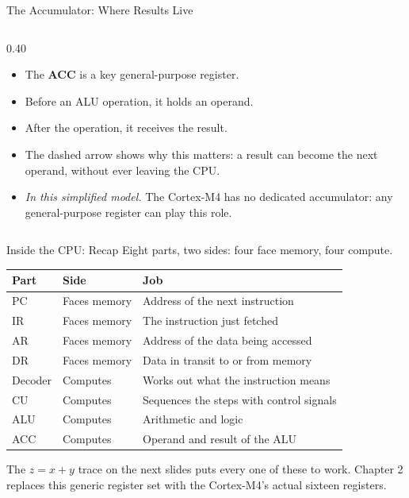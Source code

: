 \documentclass[9pt,aspectratio=169,xcolor=table]{beamer}
\begin{document}
\begin{frame}{The Accumulator: Where Results Live}
\begin{columns}[c, onlytextwidth]
		\begin{column}{0.40\textwidth}
			\small
			\begin{itemize}
				\setlength{\itemsep}{0.6em}
				\item The \textbf{ACC} is a key general-purpose register.
				\item \alert{Before} an ALU operation, it holds an operand.
				\item \alert{After} the operation, it receives the result.
				\item The dashed arrow shows why this matters: a result can become
				the next operand, without ever leaving the CPU.
				\item \emph{In this simplified model.} The Cortex-M4 has no dedicated
				accumulator: any general-purpose register can play this role.
			\end{itemize}
		\end{column}

	\end{columns}
\end{frame}

\begin{frame}{Inside the CPU: Recap}
    \leavevmode
    {\small Eight parts, two sides: four \alert{face memory}, four \alert{compute}.}

    \vspace{2mm}
    \begin{center}
    {\small
    \striped
    \begin{tabular}{@{}l l l@{}}
        \toprule
        \textbf{Part} & \textbf{Side} & \textbf{Job} \\
        \midrule
        PC & Faces memory & Address of the next instruction \\
        IR & Faces memory & The instruction just fetched \\
        AR & Faces memory & Address of the data being accessed \\
        DR & Faces memory & Data in transit to or from memory \\
        Decoder & Computes & Works out what the instruction means \\
        CU & Computes & Sequences the steps with control signals \\
        ALU & Computes & Arithmetic and logic \\
        ACC & Computes & Operand and result of the ALU \\
        \bottomrule
    \end{tabular}}
    \end{center}

    \vspace{2mm}
    {\small The $z = x + y$ trace on the next slides puts every one of these to work. Chapter 2 replaces this generic register set with the Cortex-M4's actual sixteen registers.}
\end{frame}
\end{document}
